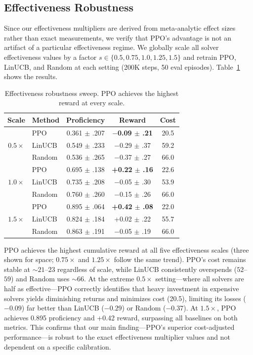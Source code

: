 \documentclass{article}
\begin{document}
\subsection{Effectiveness Robustness}

Since our effectiveness multipliers are derived from meta-analytic effect sizes rather than exact measurements, we verify that PPO's advantage is not an artifact of a particular effectiveness regime. We globally scale all solver effectiveness values by a factor $s \in \{0.5, 0.75, 1.0, 1.25, 1.5\}$ and retrain PPO, LinUCB, and Random at each setting (200K steps, 50 eval episodes). Table~\ref{tab:eff_sweep} shows the results.

\begin{table}[h]
\vspace{-0.5em}
\centering
\small
\caption{Effectiveness robustness sweep. PPO achieves the highest reward at every scale.}
\label{tab:eff_sweep}
\vspace{0.3em}
\begin{tabular}{@{}clccc@{}}
\toprule
Scale & Method & Proficiency & Reward & Cost \\
\midrule
\multirow{3}{*}{$0.5\times$}
 & PPO    & 0.361 $\pm$ .207 & \textbf{$-$0.09 $\pm$ .21} & 20.5 \\
 & LinUCB & 0.549 $\pm$ .233 & $-$0.29 $\pm$ .37 & 59.2 \\
 & Random & 0.536 $\pm$ .265 & $-$0.37 $\pm$ .27 & 66.0 \\
\midrule
\multirow{3}{*}{$1.0\times$}
 & PPO    & 0.695 $\pm$ .138 & \textbf{+0.22 $\pm$ .16} & 22.6 \\
 & LinUCB & 0.735 $\pm$ .208 & $-$0.05 $\pm$ .30 & 53.9 \\
 & Random & 0.760 $\pm$ .260 & $-$0.15 $\pm$ .26 & 66.0 \\
\midrule
\multirow{3}{*}{$1.5\times$}
 & PPO    & 0.895 $\pm$ .064 & \textbf{+0.42 $\pm$ .08} & 22.0 \\
 & LinUCB & 0.824 $\pm$ .184 & +0.02 $\pm$ .22 & 55.7 \\
 & Random & 0.863 $\pm$ .191 & $-$0.05 $\pm$ .19 & 66.0 \\
\bottomrule
\end{tabular}
\vspace{-0.5em}
\end{table}

PPO achieves the highest cumulative reward at all five effectiveness scales (three shown for space; $0.75\times$ and $1.25\times$ follow the same trend). PPO's cost remains stable at ${\sim}21$--$23$ regardless of scale, while LinUCB consistently overspends ($52$--$59$) and Random uses ${\sim}66$. At the extreme $0.5\times$ setting---where all solvers are half as effective---PPO correctly identifies that heavy investment in expensive solvers yields diminishing returns and minimizes cost (20.5), limiting its losses ($-0.09$) far better than LinUCB ($-0.29$) or Random ($-0.37$). At $1.5\times$, PPO achieves 0.895 proficiency and +0.42 reward, surpassing all baselines on both metrics. This confirms that our main finding---PPO's superior cost-adjusted performance---is robust to the exact effectiveness multiplier values and not dependent on a specific calibration.
\end{document}
